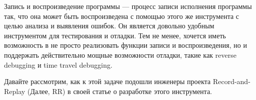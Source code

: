 Запись и воспроизведение программы — процесс записи исполнения программы так, что 
она  может быть воспроизведена с помощью этого же инструмента 
с целью анализа и выявления ошибок.
Он является довольно удобным инструментом для тестирования и отладки. Тем не менее, 
хочется иметь возможность в не просто реализовать функции записи и воспроизведения, 
но и поддержать действительно мощные возможности отладки, 
такие как reverse debugging и time travel debugging.

Давайте рассмотрим, как к этой задаче подошли инженеры проекта Record-and-Replay
(Далее, RR) в своей статье \cite{rr-paper} о разработке этого инструмента.





